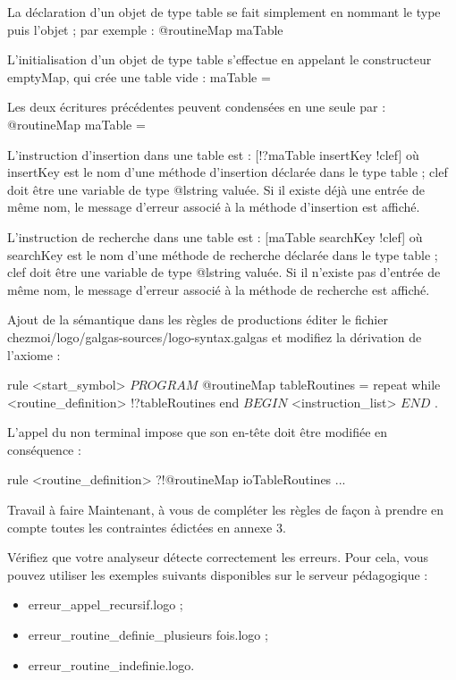 La déclaration d'un objet de type table se fait simplement en nommant le type puis l'objet ; par exemple :
	@routineMap maTable

L'initialisation d'un objet de type table s'effectue en appelant le constructeur emptyMap, qui crée une table vide :
	maTable = {}

Les deux écritures précédentes peuvent condensées en une seule par :
	@routineMap maTable = {}

L'instruction d'insertion dans une table est :
	[!?maTable insertKey !clef]
où insertKey est le nom d'une méthode d'insertion déclarée dans le type table ; clef doit être une variable de type @lstring valuée. Si il existe déjà une entrée de même nom, le message d'erreur associé à la méthode d'insertion est affiché.

L'instruction de recherche dans une table est :
	[maTable searchKey !clef]
où searchKey est le nom d'une méthode de recherche déclarée dans le type table ; clef doit être une variable de type @lstring valuée. Si il n'existe pas d'entrée de même nom, le message d'erreur associé à la méthode de recherche est affiché.

Ajout de la sémantique dans les règles de productions
éditer le fichier chezmoi/logo/galgas-sources/logo-syntax.galgas et modifiez la dérivation de l'axiome :

\begin{galgascode}
rule <start_symbol> {
  $PROGRAM$
  @routineMap tableRoutines = {}
  repeat
  while 
    <routine_definition> !?tableRoutines
  end
  $BEGIN$
  <instruction_list>
  $END$
  $.$
}
\end{galgascode}

L'appel du non terminal impose que son en-tête doit être modifiée en conséquence :
\begin{galgascode}
rule <routine_definition> ?!@routineMap ioTableRoutines {
  ...
}
\end{galgascode}

Travail à faire
Maintenant, à vous de compléter les règles de façon à prendre en compte toutes les contraintes édictées en annexe 3.

Vérifiez que votre analyseur détecte correctement les erreurs. Pour cela, vous pouvez utiliser les exemples suivants disponibles sur le serveur pédagogique :
\begin{itemize}
  \item erreur\_appel\_recursif.logo ;
  \item erreur\_routine\_definie\_plusieurs fois.logo ;
  \item erreur\_routine\_indefinie.logo.
\end{itemize}

